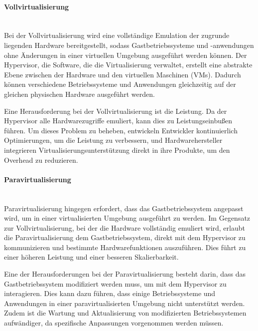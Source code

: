 \documentclass[../vs-script-first-v01.tex]{subfiles}
\begin{document}
\paragraph{Vollvirtualisierung\\\\}
Bei der Vollvirtualisierung wird eine vollständige Emulation der zugrunde liegenden Hardware bereitgestellt, sodass Gastbetriebssysteme und -anwendungen ohne Änderungen in einer virtuellen Umgebung ausgeführt werden können. Der Hypervisor, die Software, die die Virtualisierung verwaltet, erstellt eine abstrakte Ebene zwischen der Hardware und den virtuellen Maschinen (VMs). Dadurch können verschiedene Betriebssysteme und Anwendungen gleichzeitig auf der gleichen physischen Hardware ausgeführt werden.

Eine Herausforderung bei der Vollvirtualisierung ist die Leistung. Da der Hypervisor alle Hardwarezugriffe emuliert, kann dies zu Leistungseinbußen führen. Um dieses Problem zu beheben, entwickeln Entwickler kontinuierlich Optimierungen, um die Leistung zu verbessern, und Hardwarehersteller integrieren Virtualisierungsunterstützung direkt in ihre Produkte, um den Overhead zu reduzieren.
\paragraph{Paravirtualisierung\\\\}
Paravirtualisierung hingegen erfordert, dass das Gastbetriebssystem angepasst wird, um in einer virtualisierten Umgebung ausgeführt zu werden. Im Gegensatz zur Vollvirtualisierung, bei der die Hardware vollständig emuliert wird, erlaubt die Paravirtualisierung dem Gastbetriebssystem, direkt mit dem Hypervisor zu kommunizieren und bestimmte Hardwarefunktionen auszuführen. Dies führt zu einer höheren Leistung und einer besseren Skalierbarkeit.

Eine der Herausforderungen bei der Paravirtualisierung besteht darin, dass das Gastbetriebssystem modifiziert werden muss, um mit dem Hypervisor zu interagieren. Dies kann dazu führen, dass einige Betriebssysteme und Anwendungen in einer paravirtualisierten Umgebung nicht unterstützt werden. Zudem ist die Wartung und Aktualisierung von modifizierten Betriebssystemen aufwändiger, da spezifische Anpassungen vorgenommen werden müssen.
\end{document}

